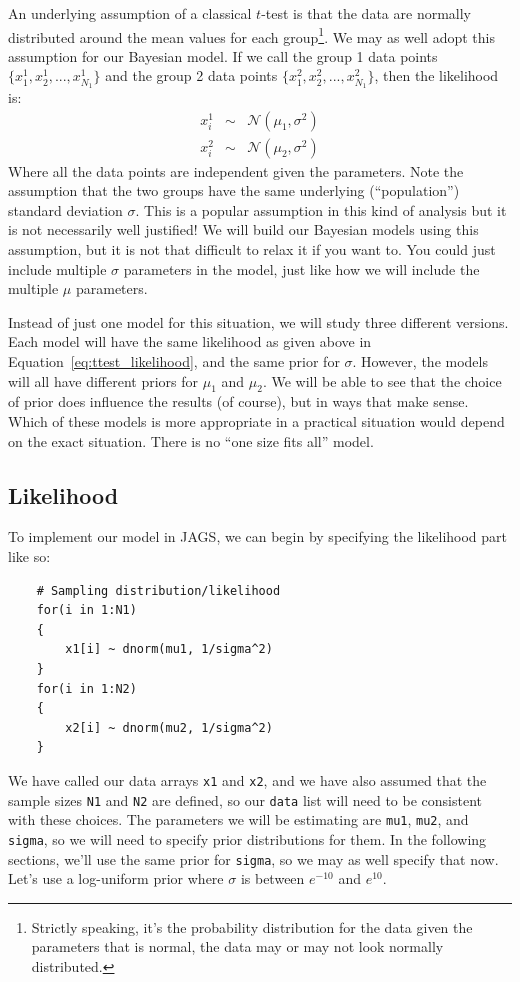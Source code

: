 An underlying assumption of a classical $t$-test is that the data are normally
distributed around the mean values for each group\footnote{Strictly speaking,
it's the probability distribution for the data given the parameters
that is normal, the data may or may not look normally distributed.}.
We may as well adopt this
assumption for our Bayesian model. If we call the group 1
data points $\{x^1_1, x^1_2, ..., x^1_{N_1}\}$ and the group 2 data points
$\{x^2_1, x^2_2, ..., x^2_{N_1}\}$, then the likelihood is:
\begin{eqnarray}
x^1_i &\sim& \mathcal{N}\left(\mu_1, \sigma^2\right)\nonumber\\
x^2_i &\sim& \mathcal{N}\left(\mu_2, \sigma^2\right)\label{eq:ttest_likelihood}
\end{eqnarray}
Where all the data points are independent given the parameters. Note the assumption that
the two groups have the same underlying (``population'') standard deviation $\sigma$. This is a popular
assumption in this kind of analysis but it is not necessarily well justified!
We will build our Bayesian models using this assumption, but it is not that
difficult to relax it if you want to. You could just include multiple
$\sigma$ parameters in the model,
just like how we will include the multiple $\mu$ parameters.

Instead of just one model for this situation, we will study three different
versions. Each model will have the same likelihood
as given above in Equation~\ref{eq:ttest_likelihood}, and the same prior
for $\sigma$. However, the models will all have different priors for $\mu_1$
and $\mu_2$.
We will be able to see that the choice of prior does
influence the results (of course), but in ways that make sense. Which of these
models is more appropriate in a practical situation would depend on the exact
situation. There is no ``one size fits all'' model.

\subsection{Likelihood}
To implement our model in JAGS, we can begin by specifying the likelihood
part like so:

\begin{framed}
\begin{verbatim}
    # Sampling distribution/likelihood
    for(i in 1:N1)
    {
        x1[i] ~ dnorm(mu1, 1/sigma^2)
    }
    for(i in 1:N2)
    {
        x2[i] ~ dnorm(mu2, 1/sigma^2)
    }
\end{verbatim}
\end{framed}
We have called our data arrays {\tt x1} and {\tt x2}, and we have also
assumed that the sample sizes {\tt N1} and {\tt N2} are defined, so our
{\tt data} list will need to be consistent with these choices. The parameters
we will be estimating are {\tt mu1}, {\tt mu2}, and {\tt sigma}, so we will
need to specify prior distributions for them. In the following sections, we'll
use the same prior for {\tt sigma}, so we may as well specify that now.
Let's use a log-uniform prior where $\sigma$ is between $e^{-10}$ and
$e^{10}$.

